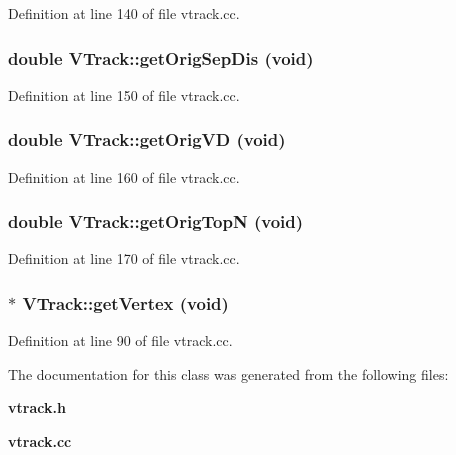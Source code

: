 Definition at line 140 of file vtrack.cc.
\subsubsection{\setlength{\rightskip}{0pt plus 5cm}double VTrack::get\-Orig\-Sep\-Dis (void)}\label{classVTrack_4e059529206f0a3976419db7f13a95a7}




Definition at line 150 of file vtrack.cc.
\subsubsection{\setlength{\rightskip}{0pt plus 5cm}double VTrack::get\-Orig\-VD (void)}\label{classVTrack_5b3876ee487b2781cb543cb52c05c477}




Definition at line 160 of file vtrack.cc.
\subsubsection{\setlength{\rightskip}{0pt plus 5cm}double VTrack::get\-Orig\-Top\-N (void)}\label{classVTrack_d178652438da940c67e6f546f73d9bfd}




Definition at line 170 of file vtrack.cc.
\subsubsection{ $\ast$ VTrack::get\-Vertex (void)}\label{classVTrack_e2c7d468b6dbfcc1536ab13eef5c331c}




Definition at line 90 of file vtrack.cc.

The documentation for this class was generated from the following files:\begin{CompactItemize}
\item 
{\bf vtrack.h}\item 
{\bf vtrack.cc}\end{CompactItemize}
